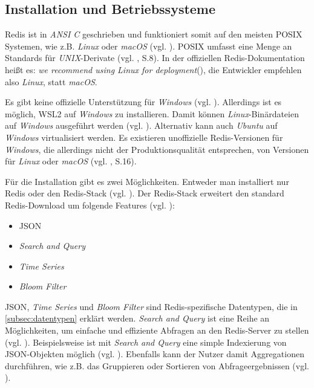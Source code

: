 
\subsection{Installation und Betriebssysteme}

\acs{Redis} ist in \textit{ANSI C} geschrieben und funktioniert somit auf den meisten \acs{POSIX} Systemen, wie z.B. \textit{Linux} oder \textit{macOS} (vgl. \cite{Redis-Docs-Intro}). \ac{POSIX} umfasst eine Menge an Standards für \textit{UNIX}-Derivate (vgl. \cite{15}, S.8). In der offiziellen \ac{Redis}-Dokumentation heißt es: \glqq \textit{we recommend using Linux for deployment}\grqq (\cite{Redis-Docs-Intro}), die Entwickler empfehlen also \textit{Linux}, statt \textit{macOS}.

Es gibt keine offizielle Unterstützung für \textit{Windows} (vgl. \cite{Redis-Docs-Intro}). Allerdings ist es möglich, \ac{WSL2} auf \textit{Windows} zu installieren. Damit können \textit{Linux}-Binärdateien auf \textit{Windows} ausgeführt werden (vgl. \cite{Redis-Docs-Install-W}). Alternativ kann auch \textit{Ubuntu} auf \textit{Windows} virtualisiert werden. Es existieren unoffizielle \ac{Redis}-Versionen für \textit{Windows}, die allerdings nicht der Produktionsqualität entsprechen, von Versionen für \textit{Linux} oder \textit{macOS} (vgl. \cite{4}, S.16). 

Für die Installation gibt es zwei Möglichkeiten. Entweder man installiert nur \ac{Redis} oder den \ac{Redis}-Stack (vgl. \cite{Redis-Docs-Install-R-or-RS}). Der \ac{Redis}-Stack erweitert den standard \ac{Redis}-Download um folgende Features (vgl. \cite{Redis-Docs-Redis-Stack}):

\begin{itemize}
	\item \ac{JSON}
	\item \textit{Search and Query}
	\item \textit{Time Series}
	\item \textit{Bloom Filter}
\end{itemize}

\ac{JSON}, \textit{Time Series} und \textit{Bloom Filter} sind \ac{Redis}-spezifische Datentypen, die in \autoref{subsec:datentypen} erklärt werden. \textit{Search and Query} ist eine Reihe an Möglichkeiten, um einfache und effiziente Abfragen an den \ac{Redis}-Server zu stellen (vgl. \cite{Redis-Docs-Search-Query}). Beispielsweise ist mit \textit{Search and Query} eine simple Indexierung von \ac{JSON}-Objekten möglich (vgl. \cite{Redis-Docs-Search-Query}). Ebenfalls kann der Nutzer damit Aggregationen durchführen, wie z.B. das Gruppieren oder Sortieren von Abfrageergebnissen (vgl. \cite{Redis-Docs-Aggregation}).  

